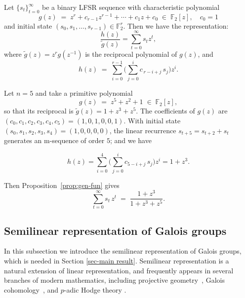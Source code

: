 \documentclass[hidelinks,onefignum,onetabnum]{siamart251216}
\theoremstyle{definition}
\theoremstyle{remark}
\begin{document}
\begin{proposition}\label{prop:gen-fun}
Let	$\{s_t\}_{t=0}^{\infty}$ be a binary LFSR sequence with characteristic polynomial
	\[
	g(z) \;=\; z^{r} + c_{r-1} z^{r-1} + \cdots + c_{1} z + c_{0}
	\;\in\; \mathbb{F}_2[z], \quad c_{0} = 1
	\]
	 and initial state
	$(s_0, s_1, \ldots, s_{r-1}) \in \mathbb{F}_2^{r}$. Then we have the representation:
	\[
	\frac{h(z)}{\widetilde{g}(z)}=\sum_{t=0}^{\infty} s_t z^{t},
	\]
where $\widetilde{g}(z) = z^{r} g(z^{-1})$ is the reciprocal polynomial of
	$g(z)$, and
	\[
	h(z) \;=\; \sum_{i=0}^{r-1}
	\bigg(\sum_{j=0}^{i} c_{\,r-i+j}\, s_{j}\bigg) z^{i}.\]
\end{proposition}

\begin{example}
	Let $n = 5$ and take a primitive polynomial
	\[
	g(z) \;=\; z^{5} + z^{2} + 1 \;\in\; \mathbb{F}_{2}[z],
	\]
	so that its reciprocal is $\widetilde{g}(z) = 1 + z^{3} + z^{5}$. The
	coefficients of $g(z)$ are
	$(c_{0},c_{1},c_{2},c_{3},c_{4},c_{5}) = (1,0,1,0,0,1)$. With initial state
	$(s_{0},s_{1},s_{2},s_{3},s_{4}) = (1,0,0,0,0)$, the linear recurrence
	$s_{t+5} = s_{t+2} + s_{t}$ generates an m-sequence of order $5$; and we have
	
 $$h(z) = \sum_{i=0}^{4} \bigl(\sum_{j=0}^{i} c_{5-i+j}\, s_{j}\bigr) z^{i}= 1 + z^{3}.$$
  
  Then Proposition~\ref{prop:gen-fun} gives
	\[
	\sum_{t=0}^{\infty} s_{t}\, z^{t}
	\;=\; \frac{1 + z^{3}}{1 + z^{3} + z^{5}}.
	\]
\end{example}



\subsection{Semilinear representation of Galois groups}
\label{subsec:semilinear}

In this subsection we introduce the semilinear representation of Galois groups, which is needed in Section \ref{sec-main result}. Semilinear representation is a natural extension of linear representation, and frequently appears in several branches of modern mathematics, including projective geometry~\cite{Artin 1957}, Galois cohomology~\cite{Serre 2002}, and $p$-adic Hodge theory \cite{Fontaine 1994}.
\end{document}
